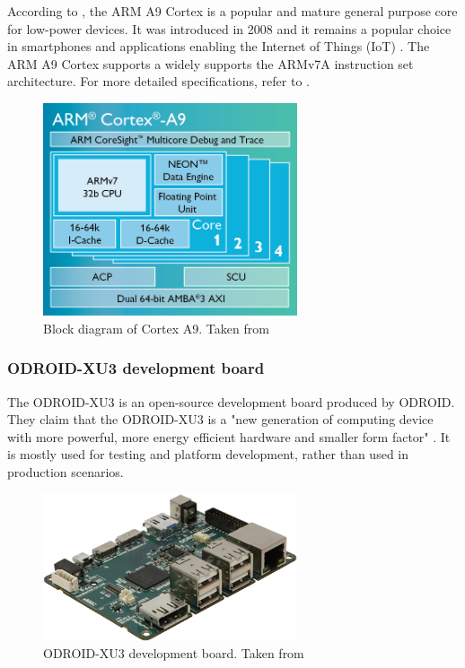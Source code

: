 According to \cite{CORTEXA9}, the ARM A9 Cortex is a popular and mature general
purpose core for low-power devices. It was introduced in 2008 and it remains a
popular choice in smartphones and applications enabling the Internet of Things
(IoT) \cite{CORTEXA9}. The ARM A9 Cortex supports a widely supports the ARMv7A 
instruction set architecture. For more detailed specifications, refer to
\cite{CORTEXA9}.

\begin{figure}[h!]
  \centering
    \includegraphics[width=75mm]{"img/cortexA9"}
    \caption{Block diagram of Cortex A9. Taken from \cite{CORTEXA9}}
    \label{fig:cortexA9}
\end{figure}


\subsubsection{ODROID-XU3 development board}

The ODROID-XU3 \cite{ODROID_XU3} is an open-source development board produced by
ODROID. They claim that the ODROID-XU3 is a "new generation of computing device
with more powerful, more energy efficient hardware and smaller form factor"
\cite{ODROID_XU3}. It is mostly used for testing and platform development,
rather than used in production scenarios.

 \begin{figure}[h!]
  \centering
    \includegraphics[width=75mm]{"img/odroid"}
    \caption{ODROID-XU3 development board. Taken from \cite{ODROID_XU3}}
    \label{fig:odroid}
\end{figure}

